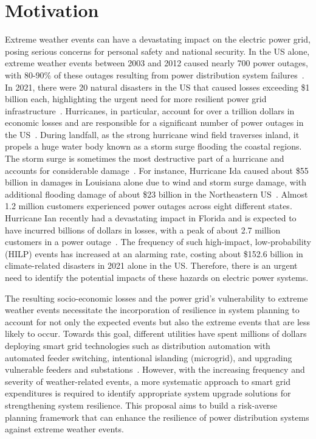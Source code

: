 \section{Motivation}
Extreme weather events can have a devastating impact on the electric power grid, posing serious concerns for personal safety and national security. In the US alone, extreme weather events between 2003 and 2012 caused nearly 700 power outages, with 80-90\% of these outages resulting from power distribution system failures~\cite{DOE_res}. In 2021, there were 20 natural disasters in the US that caused losses exceeding \$1 billion each, highlighting the urgent need for more resilient power grid infrastructure~\cite{noaa}. Hurricanes, in particular, account for over a trillion dollars in economic losses and are responsible for a significant number of power outages in the US~\cite{cost_NOAA, 2020}. During landfall, as the strong hurricane wind field traverses inland, it propels a huge water body known as a storm surge flooding the coastal regions. The storm surge is sometimes the most destructive part of a hurricane and accounts for considerable damage~\cite{surge_web}. For instance, Hurricane Ida caused about \$55 billion in damages in Louisiana alone due to wind and storm surge damage, with additional flooding damage of about \$23 billion in the Northeastern US~\cite{IDA_NOAA}. Almost 1.2 million customers experienced power outages across eight different states. Hurricane Ian recently had a devastating impact in Florida and is expected to have incurred billions of dollars in losses, with a peak of about 2.7 million customers in a power outage~\cite{DOE_IAN}. The frequency of such high-impact, low-probability (HILP) events has increased at an alarming rate, costing about \$152.6 billion in climate-related disasters in 2021 alone in the US. Therefore, there is an urgent need to identify the potential impacts of these hazards on electric power systems. 

The resulting socio-economic losses and the power grid's vulnerability to extreme weather events necessitate the incorporation of resilience in system planning to account for not only the expected events but also the extreme events that are less likely to occur. Towards this goal, different utilities have spent millions of dollars deploying smart grid technologies such as distribution automation with automated feeder switching, intentional islanding (microgrid), and upgrading vulnerable feeders and substations~\cite{9120304}. However, with the increasing frequency and severity of weather-related events, a more systematic approach to smart grid expenditures is required to identify appropriate system upgrade solutions for strengthening system resilience. This proposal aims to build a risk-averse planning framework that can enhance the resilience of power distribution systems against extreme weather events.

